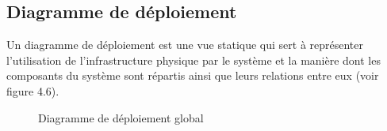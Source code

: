 \subsection{\selectfont\Large Diagramme de déploiement}
\textsf{\selectfont{} Un diagramme de déploiement est une vue statique qui sert à représenter l'utilisation de l'infrastructure physique par le système et la manière dont les composants du système sont répartis ainsi que leurs relations entre eux (voir figure 4.6).\cite{15}}
\begin{figure}[H]
  \begin{center}
  

  \end{center}
  
  \caption{Diagramme de déploiement global}
\end{figure}
